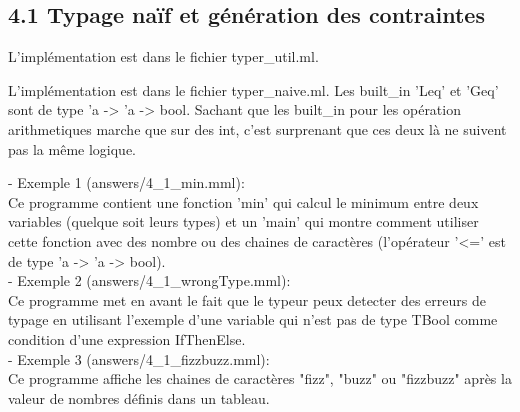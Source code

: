 \documentclass{article}
\begin{document}
\subsection{4.1 Typage naïf et génération des contraintes}

{
  L'implémentation est dans le fichier typer\_util.ml.\\
}
{}

{
  L'implémentation est dans le fichier typer\_naive.ml.
}
{
  Les built\_in 'Leq' et 'Geq' sont de type 'a -> 'a -> bool. 
  Sachant que les built\_in pour les
  opération arithmetiques marche que sur des int, c'est surprenant que ces deux 
  là ne suivent pas la même logique.
}

{
  - Exemple 1 (answers/4\_1\_min.mml):\\
    Ce programme contient une fonction 'min' qui calcul le minimum entre deux 
    variables (quelque soit leurs types) et un 'main' qui montre comment utiliser
    cette fonction avec des nombre ou des chaines de caractères
    (l'opérateur '<=' est de type 'a -> 'a -> bool).\\
  - Exemple 2 (answers/4\_1\_wrongType.mml):\\
    Ce programme met en avant le fait que le typeur peux detecter des erreurs de
    typage en utilisant l'exemple d'une variable qui n'est pas de type TBool comme
    condition d'une expression IfThenElse.\\
  - Exemple 3 (answers/4\_1\_fizzbuzz.mml):\\
    Ce programme affiche les chaines de caractères "fizz", "buzz" ou "fizzbuzz" 
    après la valeur de nombres définis dans un tableau.

}
{}
\end{document}
